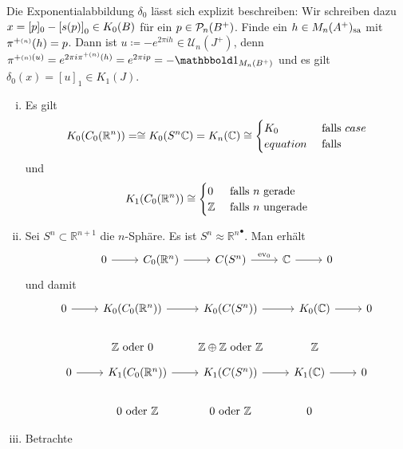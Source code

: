 \begin{bemerkung}[label=bem:99]
	Die Exponentialabbildung $\delta_0$ lässt sich explizit beschreiben:
	Wir schreiben dazu $x = [p]_0 - \benbrace*{s(p)}_0 \in K_0(B)$ für ein $p \in \kernedP_n(B^+)$.
	Finde ein $h \in M_n(A^+)_\sa$ mit $\pi^{+\ssbrace{n}}(h)=p$.
	Dann ist $u \coloneqq -e^{2 \pi i h} \in \mathcal{U}_n(J^+)$, denn $\pi^{+\ssbrace{n}(u)} = e^{2 \pi i \pi^{+ \ssbrace{n}}(h)} = e^{2 \pi i p} = -\ind_{M_n(B^+)}$ und es gilt $\delta_0(x) = [u]_1 \in K_1(J)$.
\end{bemerkung}

\begin{beispiel}
	\begin{enumerate}[(i)]
		\item Es gilt 
		\[
			K_0 \enbrace*{C_0(\mathbb{R}^n)} =\cong K_0(S^n \mathbb{C}) = K_n(\mathbb{C}) \cong \begin{cases}
				K_0 &\text{ falls }case\\
				equation &\text{ falls }
			\end{cases}
		\]
		und
		\[
			K_1 \enbrace*{C_0(\mathbb{R}^n)} \cong \begin{cases}
				0 &\text{ falls }n \text{ gerade} \\
				\mathbb{Z} &\text{ falls } n \text{ ungerade} 
			\end{cases}
		\]
		\item Sei $S^n \subset \mathbb{R}^{n+1}$ die $n$-Sphäre. 
		Es ist $S^n \approx {\mathbb{R}^n}^\bullet$.
		Man erhält
		\[
			\begin{tikzcd}
				0 \rar & C_0(\mathbb{R}^n) \rar & C(S^n) \rar["\ev_0"] & \mathbb{C} \rar & 0
			\end{tikzcd}
		\]
		und damit
		\[
			\begin{tikzcd}
				0 \rar & K_0 \enbrace*{C_0(\mathbb{R}^n)} \rar & K_0 \enbrace*{C(S^n)} \rar & K_0(\mathbb{C}) \rar & 0 \\
				& \mathbb{Z} \text{ oder } 0 & \mathbb{Z} \oplus \mathbb{Z} \text{ oder } \mathbb{Z} & \mathbb{Z}  
			\end{tikzcd}
		\]
		\[
			\begin{tikzcd}
				0 \rar & K_1 \enbrace*{C_0(\mathbb{R}^n)} \rar & K_1 \enbrace*{C(S^n)} \rar & K_1(\mathbb{C}) \rar & 0 \\
				& 0 \text{ oder } \mathbb{Z} & 0 \text{ oder } \mathbb{Z} & 0  
			\end{tikzcd}
		\]
		\item Betrachte
		\[
			\begin{tikzcd}

\end{tikzcd}\]
\end{enumerate}
\end{beispiel}
